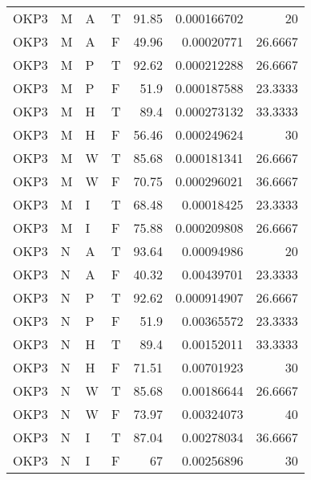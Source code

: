 \begin{tabular}{llllrrr}
    OKP3     & M     & A     & T          & 91.85      & 0.000166702 & 20       \\
    OKP3     & M     & A     & F          & 49.96      & 0.00020771  & 26.6667  \\
    OKP3     & M     & P     & T          & 92.62      & 0.000212288 & 26.6667  \\
    OKP3     & M     & P     & F          & 51.9       & 0.000187588 & 23.3333  \\
    OKP3     & M     & H     & T          & 89.4       & 0.000273132 & 33.3333  \\
    OKP3     & M     & H     & F          & 56.46      & 0.000249624 & 30       \\
    OKP3     & M     & W     & T          & 85.68      & 0.000181341 & 26.6667  \\
    OKP3     & M     & W     & F          & 70.75      & 0.000296021 & 36.6667  \\
    OKP3     & M     & I     & T          & 68.48      & 0.00018425  & 23.3333  \\
    OKP3     & M     & I     & F          & 75.88      & 0.000209808 & 26.6667  \\
    OKP3     & N     & A     & T          & 93.64      & 0.00094986  & 20       \\
    OKP3     & N     & A     & F          & 40.32      & 0.00439701  & 23.3333  \\
    OKP3     & N     & P     & T          & 92.62      & 0.000914907 & 26.6667  \\
    OKP3     & N     & P     & F          & 51.9       & 0.00365572  & 23.3333  \\
    OKP3     & N     & H     & T          & 89.4       & 0.00152011  & 33.3333  \\
    OKP3     & N     & H     & F          & 71.51      & 0.00701923  & 30       \\
    OKP3     & N     & W     & T          & 85.68      & 0.00186644  & 26.6667  \\
    OKP3     & N     & W     & F          & 73.97      & 0.00324073  & 40       \\
    OKP3     & N     & I     & T          & 87.04      & 0.00278034  & 36.6667  \\
    OKP3     & N     & I     & F          & 67         & 0.00256896  & 30       \\
    \hline
\end{tabular}